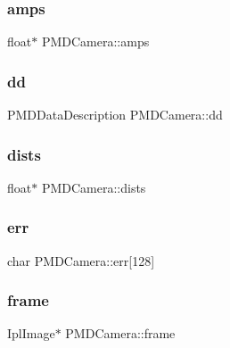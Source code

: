\subsubsection{\texorpdfstring{amps}{amps}}
{\footnotesize\ttfamily float$\ast$ P\+M\+D\+Camera\+::amps\hspace{0.3cm}{\ttfamily [private]}}

\hypertarget{class_p_m_d_camera_add31d3bba3f20568e45e3dd864a5bda9}{}\label{class_p_m_d_camera_add31d3bba3f20568e45e3dd864a5bda9} 
\subsubsection{\texorpdfstring{dd}{dd}}
{\footnotesize\ttfamily P\+M\+D\+Data\+Description P\+M\+D\+Camera\+::dd\hspace{0.3cm}{\ttfamily [private]}}

\hypertarget{class_p_m_d_camera_a6aa74776638ecb0b1869a1e12734870a}{}\label{class_p_m_d_camera_a6aa74776638ecb0b1869a1e12734870a} 
\subsubsection{\texorpdfstring{dists}{dists}}
{\footnotesize\ttfamily float$\ast$ P\+M\+D\+Camera\+::dists\hspace{0.3cm}{\ttfamily [private]}}

\hypertarget{class_p_m_d_camera_a096946b5bca77dd8fe416c31f850ae75}{}\label{class_p_m_d_camera_a096946b5bca77dd8fe416c31f850ae75} 
\subsubsection{\texorpdfstring{err}{err}}
{\footnotesize\ttfamily char P\+M\+D\+Camera\+::err\mbox{[}128\mbox{]}\hspace{0.3cm}{\ttfamily [private]}}

\hypertarget{class_p_m_d_camera_ad47d6be8f7f11d2772690d3ea36dd432}{}\label{class_p_m_d_camera_ad47d6be8f7f11d2772690d3ea36dd432} 
\subsubsection{\texorpdfstring{frame}{frame}}
{\footnotesize\ttfamily Ipl\+Image$\ast$ P\+M\+D\+Camera\+::frame\hspace{0.3cm}{\ttfamily [private]}}

